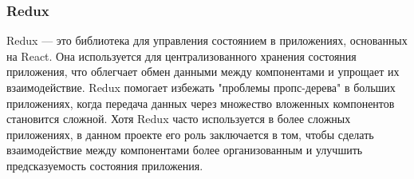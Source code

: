 \subsubsection*{Redux}
Redux --- это библиотека для управления состоянием в приложениях, основанных на React. Она используется для централизованного хранения состояния приложения, что облегчает обмен данными между компонентами и упрощает их взаимодействие. Redux помогает избежать "проблемы пропс-дерева" в больших приложениях, когда передача данных через множество вложенных компонентов становится сложной. Хотя Redux часто используется в более сложных приложениях, в данном проекте его роль заключается в том, чтобы сделать взаимодействие между компонентами более организованным и улучшить предсказуемость состояния приложения.


